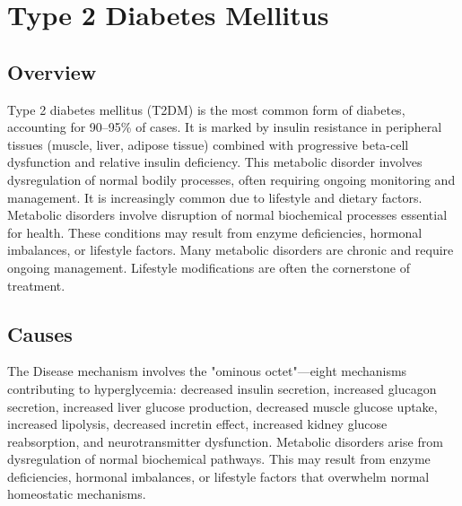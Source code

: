 \chapter{Type 2 Diabetes Mellitus}
\label{sec:Type 2 Diabetes Mellitus}

\section{Overview}
Type 2 diabetes mellitus (T2DM) is the most common form of diabetes, accounting for 90--95\% of cases. It is marked by insulin resistance in peripheral tissues (muscle, liver, adipose tissue) combined with progressive beta-cell dysfunction and relative insulin deficiency. This metabolic disorder involves dysregulation of normal bodily processes, often requiring ongoing monitoring and management. It is increasingly common due to lifestyle and dietary factors. Metabolic disorders involve disruption of normal biochemical processes essential for health. These conditions may result from enzyme deficiencies, hormonal imbalances, or lifestyle factors. Many metabolic disorders are chronic and require ongoing management. Lifestyle modifications are often the cornerstone of treatment.
\section{Causes}
The Disease mechanism involves the "ominous octet"---eight mechanisms contributing to hyperglycemia: decreased insulin secretion, increased glucagon secretion, increased liver glucose production, decreased muscle glucose uptake, increased lipolysis, decreased incretin effect, increased kidney glucose reabsorption, and neurotransmitter dysfunction. Metabolic disorders arise from dysregulation of normal biochemical pathways. This may result from enzyme deficiencies, hormonal imbalances, or lifestyle factors that overwhelm normal homeostatic mechanisms.   
